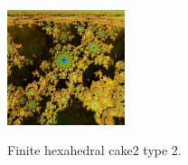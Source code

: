 \documentclass[suppldata, dvipdfmx]{interact}
\theoremstyle{plain}%
\theoremstyle{definition}
\theoremstyle{remark}
\theoremstyle{problemstyle}
\begin{document}
\begin{figure}[H]
\begin{minipage}{0.5\textwidth}
\begin{minipage}[t]{0.24\textwidth}
  \end{minipage}
  \hspace*{\fill}
  \begin{minipage}[t]{0.24\textwidth}
   \centering
   \includegraphics[width=1.35in, height=1.35in,
   keepaspectratio]{./img/sphairahedron/hexahedralCake2/limitsetInf_b.jpg} 
   \label{fig:cake2Type2InfLimitset}
  \end{minipage}
  \hspace*{\fill}
  \caption{Finite hexahedral cake2 type 2.}
  \label{fig:cake2Type2infinite}
 \end{minipage}
\end{figure}
\end{document}
